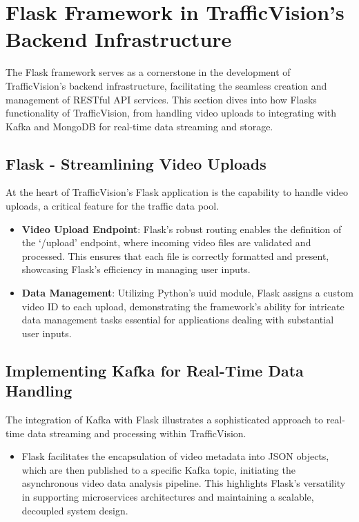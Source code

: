 
\section{Flask Framework in TrafficVision's Backend Infrastructure}
The Flask framework serves as a cornerstone in the development of TrafficVision's backend infrastructure, facilitating the seamless creation and management of RESTful API services. This section dives into how Flasks functionality of TrafficVision, from handling video uploads to integrating with Kafka and MongoDB for real-time data streaming and storage.

\subsection{Flask - Streamlining Video Uploads}
At the heart of TrafficVision's Flask application is the capability to handle video uploads, a critical feature for the traffic data pool.
\begin{itemize}
    \item \textbf{Video Upload Endpoint}: Flask's robust routing enables the definition of the `/upload' endpoint, where incoming video files are validated and processed. This ensures that each file is correctly formatted and present, showcasing Flask's efficiency in managing user inputs.
    
    \item \textbf{Data Management}: Utilizing Python's uuid module, Flask assigns a custom video ID to each upload, demonstrating the framework's ability for intricate data management tasks essential for applications dealing with substantial user inputs.
\end{itemize}

\subsection{Implementing Kafka for Real-Time Data Handling}
The integration of Kafka with Flask illustrates a sophisticated approach to real-time data streaming and processing within TrafficVision.
\begin{itemize}
    \item Flask facilitates the encapsulation of video metadata into JSON objects, which are then published to a specific Kafka topic, initiating the asynchronous video data analysis pipeline. This highlights Flask's versatility in supporting microservices architectures and maintaining a scalable, decoupled system design.
\end{itemize}

